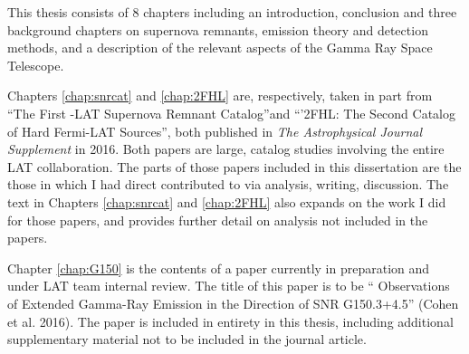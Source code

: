 This thesis consists of 8 chapters including an introduction, conclusion and three background chapters on supernova remnants, \gam{} emission theory and detection methods, and a description of the relevant aspects of the \Fermi{} Gamma Ray Space Telescope.

Chapters \ref{chap:snrcat} and  \ref{chap:2FHL} are, respectively, taken in part from ``The First \Fermi{}-LAT Supernova Remnant Catalog''and ``'2FHL: The Second Catalog of Hard Fermi-LAT Sources'', both published in \emph{The Astrophysical Journal Supplement} in 2016. Both papers are large, catalog studies involving the entire LAT collaboration. The parts of those papers included in this dissertation are the those in which I had direct contributed to via analysis, writing, discussion. The text in Chapters \ref{chap:snrcat} and \ref{chap:2FHL} also expands on the work I did for those papers, and provides further detail on analysis not included in the papers.

Chapter \ref{chap:G150} is the contents of a paper currently in preparation and under LAT team internal review. The title of this paper is to be ``\FermiLat{} Observations of Extended Gamma-Ray Emission in the Direction of SNR G150.3+4.5'' (Cohen et al. 2016). The paper is included in entirety in this thesis, including additional supplementary material not to be included in the journal article. 



